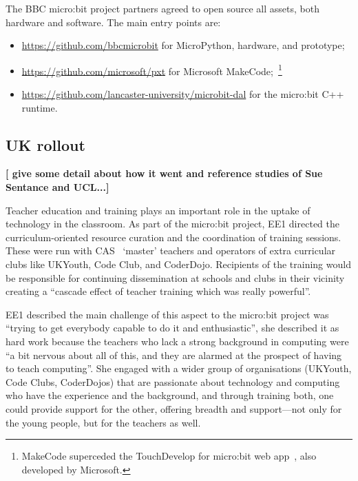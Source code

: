 The BBC micro:bit project partners agreed to open source all assets, both
hardware and software. The main entry points are:
\begin{itemize}
\item \url{https://github.com/bbcmicrobit} for MicroPython, hardware, and prototype;
\item \url{https://github.com/microsoft/pxt} for Microsoft MakeCode;~\footnote{
MakeCode superceded the TouchDevelop for micro:bit web app~\cite{ball2016microsoft}, also developed by Microsoft.    
}
\item \url{https://github.com/lancaster-university/microbit-dal} for the micro:bit
C++ runtime.
\end{itemize}


\subsection{UK rollout}

{\bf [ give some detail about how it went and reference studies of Sue Sentance and
UCL...]}

Teacher education and training plays an important role in the uptake of technology in the classroom. As part of the micro:bit project, EE1 directed the curriculum-oriented resource curation and the coordination of training sessions. These were run with CAS~\cite{crick2011computing} `master' teachers and operators of extra curricular clubs like UKYouth, Code Club, and CoderDojo. Recipients of the training would be responsible for continuing dissemination at schools and clubs in their vicinity creating a ``cascade effect of teacher training which was really powerful''.

EE1 described the main challenge of this aspect to the micro:bit project was ``trying to get everybody capable to do it and enthusiastic'', she described it as hard work because the teachers who lack a strong background in computing were ``a bit nervous about all of this, and they are alarmed at the prospect of having to teach computing''. She engaged with a wider group of organisations (UKYouth, Code Clubs, CoderDojos) that are passionate about technology and computing who have the experience and the background, and through training both, one could provide support for the other, offering breadth and support---not only for the young people, but for the teachers as well.


